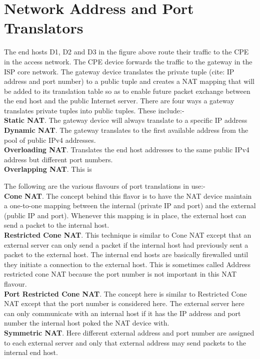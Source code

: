\documentclass[iwp,first]{luthesis}
\begin{document}
\section{Network Address and Port Translators}

 
The end hosts  D1, D2 and D3 in the figure above route their traffic to the CPE in the access network. The CPE device forwards the traffic to the gateway in the ISP core network. The gateway device translates the private tuple (cite: IP address and port number) to a public tuple and creates a NAT mapping that will be added to its translation table so as to enable future packet exchange between the end host and the public Internet server. There are four ways a gateway translates private tuples into public tuples. These include:- 
\\{\bf Static NAT}. The gateway device will always translate to a specific IP address 
\\{\bf Dynamic NAT}. The gateway translates to the first available address from the pool of public IPv4 addresses. 
\\{\bf Overloading NAT}. Translates the end host addresses to the same public IPv4 address but different port numbers. 
\\{\bf Overlapping NAT}. This is  


The following are the various flavours of port translations in use:-
\\ {\bf Cone NAT}. The concept behind this flavor is to have the NAT device maintain a one-to-one mapping between the internal (private IP and port) and the external (public IP and port). Whenever this mapping is in place, the external host can send a packet to the internal host. 
\\ {\bf Restricted Cone NAT}. This technique is similar to Cone NAT except that an external server can only send a packet if the internal host had previously sent a packet to the external host. The internal end hosts are basically firewalled until they initiate a connection to the external host. This is sometimes called Address restricted cone NAT because the port number is not important in this NAT flavour.
\\ {\bf  Port Restricted Cone NAT}. The concept here is similar to Restricted Cone NAT except that the port number is considered here. The external server here can only communicate with an internal host if it has the IP address and port number the internal host poked the NAT device with.
\\ {\bf Symmetric NAT}.  Here different external address and port number are assigned to each external server and only that external address may send packets to the internal end host.
\end{document}
